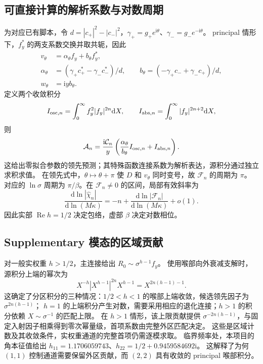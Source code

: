 \documentclass[UTF8,fontset=fandol,11pt,a4paper]{ctexart}
\newcommand{\ii}{\mathrm{i}}
\newcommand{\dd}{\mathrm{d}}
\newcommand{\Rea}{\operatorname{Re}}
\numberwithin{equation}{section}
\begin{document}
\subsection{可直接计算的解析系数与对数周期}
为对应已有脚本，令 $d=|c_+|^2-|c_-|^2$，$\gamma_+=g_+e^{\ii\theta}$、$\gamma_-=g_-e^{-\ii\theta}$。
principal 情形下，$f_y^*$ 的两支系数交换并取共轭，因此
\begin{align}
v_\theta&=\alpha_\theta f_y+b_\theta f_y^*,\\
\alpha_\theta&=(\gamma_+c_+^*-\gamma_-c_-^*)/d,\qquad
b_\theta=(-\gamma_+c_-+\gamma_-c_+)/d,\\
w_\theta&=\ii y b_\theta.
\end{align}
定义两个收敛积分
\begin{equation}
I_{{\rm osc},n}=\int_0^\infty f_y^2|f_y|^{2n}\dd X,\qquad
I_{{\rm abs},n}=\int_0^\infty|f_y|^{2n+2}\dd X,
\end{equation}
则
\begin{equation}
\mathcal A_n=\frac{\ii\mathcal C_n}{y}
\left(\frac{\alpha_\theta}{b_\theta}I_{{\rm osc},n}+I_{{\rm abs},n}\right).
\label{eq:principal-computable-v2}
\end{equation}
这给出零拟合参数的领先预测；其特殊函数连接系数为解析表达，源积分通过独立求积求值。
在领先式中，$\theta\mapsto\theta+\pi$ 使 $D$ 和 $v_\theta$ 同时变号，故 $\mathcal F_n$ 的周期为 $\pi$。
对应的 $\ln\sigma$ 周期为 $\pi/\beta$。在 $\mathcal F_n\ne0$ 的区间，局部有效斜率为
\begin{equation}
\frac{\dd\ln|\widehat\chi_n|}{\dd\ln(M\kappa)}
=-n+\frac{\dd\ln|\mathcal F_n|}{\dd\ln(M\kappa)}+o(1).
\end{equation}
因此实部 $\Rea h=1/2$ 决定包络，虚部 $\beta$ 决定对数相位。

\subsection{Supplementary 模态的区域贡献}
对一般实权重 $h>1/2$，主连接给出 $R_0\sim\sigma^{h-1}f_y$。
使用喉部向外衰减支解时，源积分上端的幂次为
\begin{equation}
X^{-h}|X^{h-1}|^{2n}X^{h-1}
=X^{2n(h-1)-1}.
\end{equation}
这确定了分区积分的三种情况：$1/2<h<1$ 的喉部上端收敛，候选领先因子为 $\sigma^{2n(h-1)}$；
$h=1$ 的上端积分产生对数，需要采用相应的退化连接；$h>1$ 的积分依赖 $X\sim\sigma^{-1}$ 的匹配上限。
在 $h>1$ 情形，该上限贡献提供 $\sigma^{-2n(h-1)}$，与固定入射因子相乘得到零次幂量级，首项系数由完整外区匹配决定。
这些是区域计数及其收敛条件，实权重通道的完整首项仍需逐模求取。
临界频率处，本项目的角本征值给出 $h_{11}=1.1706059743$、$h_{22}=1/2+0.9459584692\ii$。
这解释了为何 $(1,1)$ 控制通道需要保留外区贡献，而 $(2,2)$ 具有收敛的 principal 喉部积分。
\end{document}
